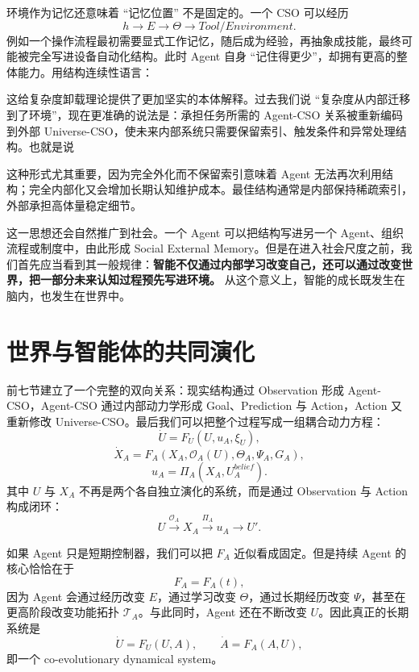 环境作为记忆还意味着 ``记忆位置'' 不是固定的。一个 CSO 可以经历
\[
h
\rightarrow
E
\rightarrow
\Theta
\rightarrow
Tool/Environment.
\]
例如一个操作流程最初需要显式工作记忆，随后成为经验，再抽象成技能，最终可能被完全写进设备自动化结构。此时 Agent 自身 ``记住得更少''，却拥有更高的整体能力。用结构连续性语言：
\begin{statementbox}
\centering
{}
\end{statementbox}

这给复杂度卸载理论提供了更加坚实的本体解释。过去我们说 ``复杂度从内部迁移到了环境''，现在更准确的说法是：承担任务所需的 Agent-CSO 关系被重新编码到外部 Universe-CSO，使未来内部系统只需要保留索引、触发条件和异常处理结构。也就是说
\begin{statementbox}
\centering
{}
\end{statementbox}
这种形式尤其重要，因为完全外化而不保留索引意味着 Agent 无法再次利用结构；完全内部化又会增加长期认知维护成本。最佳结构通常是内部保持稀疏索引，外部承担高体量稳定细节。

这一思想还会自然推广到社会。一个 Agent 可以把结构写进另一个 Agent、组织流程或制度中，由此形成 Social External Memory。但是在进入社会尺度之前，我们首先应当看到其一般规律：\textbf{智能不仅通过内部学习改变自己，还可以通过改变世界，把一部分未来认知过程预先写进环境。} 从这个意义上，智能的成长既发生在脑内，也发生在世界中。


\section{世界与智能体的共同演化}

前七节建立了一个完整的双向关系：现实结构通过 Observation 形成 Agent-CSO，Agent-CSO 通过内部动力学形成 Goal、Prediction 与 Action，Action 又重新修改 Universe-CSO。最后我们可以把整个过程写成一组耦合动力方程：
\[
\dot U
=
F_U
\left(
U,
u_A,
\xi_U
\right),
\]
\[
\dot X_A
=
F_A
\left(
X_A,
\mathcal O_A(U),
\Theta_A,
\Psi_A,
G_A
\right),
\]
\[
u_A
=
\Pi_A
\left(
X_A,U_A^{belief}
\right).
\]
其中 $U$ 与 $X_A$ 不再是两个各自独立演化的系统，而是通过 Observation 与 Action 构成闭环：
\[
\boxed{
U
\overset{\mathcal O_A}{\longrightarrow}
X_A
\overset{\Pi_A}{\longrightarrow}
u_A
\longrightarrow
U'.
}
\]

如果 Agent 只是短期控制器，我们可以把 $F_A$ 近似看成固定。但是持续 Agent 的核心恰恰在于
\[
F_A=F_A(t),
\]
因为 Agent 会通过经历改变 $E$，通过学习改变 $\Theta$，通过长期经历改变 $\Psi$，甚至在更高阶段改变功能拓扑 $\mathcal T_A$。与此同时，Agent 还在不断改变 $U$。因此真正的长期系统是
\[
\boxed{
\dot U=F_U(U,A),
\qquad
\dot A=F_A(A,U),
}
\]
即一个 co-evolutionary dynamical system。

